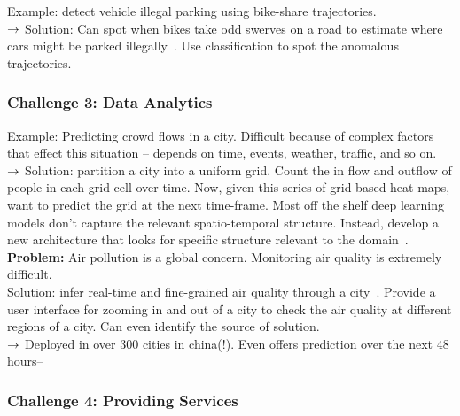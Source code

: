 Example: detect vehicle illegal parking using bike-share trajectories. \\

$\rightarrow$ Solution: Can spot when bikes take odd swerves on a road to estimate where cars might be parked illegally~\cite{he2018detecting}. Use classification to spot the anomalous trajectories. \\


\subsubsection{Challenge 3: Data Analytics}

Example: Predicting crowd flows in a city. Difficult because of complex factors that effect this situation -- depends on time, events, weather, traffic, and so on. \\

$\rightarrow$ Solution: partition a city into a uniform grid. Count the in flow and outflow of people in each grid cell over time. Now, given this series of grid-based-heat-maps, want to predict the grid at the next time-frame. Most off the shelf deep learning models don't capture the relevant spatio-temporal structure. Instead, develop a new architecture that looks for specific structure relevant to the domain~\cite{zhang2017deep}. \\


{\bf Problem:} Air pollution is a global concern. Monitoring air quality is extremely difficult. \\

Solution: infer real-time and fine-grained air quality through a city~\cite{zheng2013u}. Provide a user interface for zooming in and out of a city to check the air quality at different regions of a city. Can even identify the source of solution. \\

$\rightarrow$ Deployed in over 300 cities in china(!). Even offers prediction over the next 48 hours--\\

\subsubsection{Challenge 4: Providing Services}


